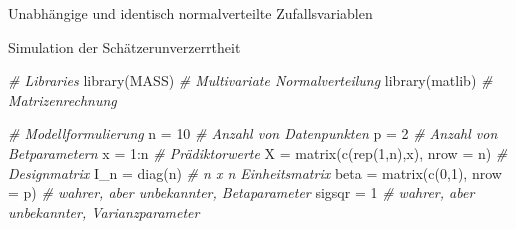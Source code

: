 \documentclass[
  8pt,
  ignorenonframetext,
]{beamer}
\newenvironment{Shaded}{\begin{snugshade}}{\end{snugshade}}
\newcommand{\AttributeTok}[1]{\textcolor[rgb]{0.77,0.63,0.00}{#1}}
\newcommand{\CommentTok}[1]{\textcolor[rgb]{0.56,0.35,0.01}{\textit{#1}}}
\newcommand{\DecValTok}[1]{\textcolor[rgb]{0.00,0.00,0.81}{#1}}
\newcommand{\FunctionTok}[1]{\textcolor[rgb]{0.00,0.00,0.00}{#1}}
\newcommand{\NormalTok}[1]{#1}
\newcommand{\OtherTok}[1]{\textcolor[rgb]{0.56,0.35,0.01}{#1}}
\newcommand{\SpecialCharTok}[1]{\textcolor[rgb]{0.00,0.00,0.00}{#1}}
\begin{document}
\begin{frame}[fragile]{Unabhängige und identisch normalverteilte
Zufallsvariablen}
\protect\hypertarget{unabhuxe4ngige-und-identisch-normalverteilte-zufallsvariablen-5}{}
\footnotesize

Simulation der Schätzerunverzerrtheit \vspace{2mm}

\footnotesize

\begin{Shaded}
\begin{Highlighting}[]
\CommentTok{\# Libraries}
\FunctionTok{library}\NormalTok{(MASS)                                       }\CommentTok{\# Multivariate Normalverteilung }
\FunctionTok{library}\NormalTok{(matlib)                                     }\CommentTok{\# Matrizenrechnung}

\CommentTok{\# Modellformulierung}
\NormalTok{n        }\OtherTok{=} \DecValTok{10}                                       \CommentTok{\# Anzahl von Datenpunkten}
\NormalTok{p        }\OtherTok{=} \DecValTok{2}                                        \CommentTok{\# Anzahl von Betparametern}
\NormalTok{x        }\OtherTok{=} \DecValTok{1}\SpecialCharTok{:}\NormalTok{n                                      }\CommentTok{\# Prädiktorwerte}
\NormalTok{X        }\OtherTok{=} \FunctionTok{matrix}\NormalTok{(}\FunctionTok{c}\NormalTok{(}\FunctionTok{rep}\NormalTok{(}\DecValTok{1}\NormalTok{,n),x), }\AttributeTok{nrow =}\NormalTok{ n)          }\CommentTok{\# Designmatrix}
\NormalTok{I\_n      }\OtherTok{=} \FunctionTok{diag}\NormalTok{(n)                                  }\CommentTok{\# n x n Einheitsmatrix}
\NormalTok{beta     }\OtherTok{=} \FunctionTok{matrix}\NormalTok{(}\FunctionTok{c}\NormalTok{(}\DecValTok{0}\NormalTok{,}\DecValTok{1}\NormalTok{), }\AttributeTok{nrow =}\NormalTok{ p)                 }\CommentTok{\# wahrer, aber unbekannter, Betaparameter}
\NormalTok{sigsqr   }\OtherTok{=} \DecValTok{1}                                        \CommentTok{\# wahrer, aber unbekannter, Varianzparameter}


\end{Highlighting}
\end{Shaded}
\end{frame}
\end{document}
